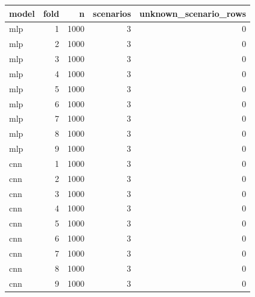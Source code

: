 \begin{tabular}{lrrrr}
\toprule
model & fold & n & scenarios & unknown\_scenario\_rows \\
\midrule
mlp & 1 & 1000 & 3 & 0 \\
mlp & 2 & 1000 & 3 & 0 \\
mlp & 3 & 1000 & 3 & 0 \\
mlp & 4 & 1000 & 3 & 0 \\
mlp & 5 & 1000 & 3 & 0 \\
mlp & 6 & 1000 & 3 & 0 \\
mlp & 7 & 1000 & 3 & 0 \\
mlp & 8 & 1000 & 3 & 0 \\
mlp & 9 & 1000 & 3 & 0 \\
cnn & 1 & 1000 & 3 & 0 \\
cnn & 2 & 1000 & 3 & 0 \\
cnn & 3 & 1000 & 3 & 0 \\
cnn & 4 & 1000 & 3 & 0 \\
cnn & 5 & 1000 & 3 & 0 \\
cnn & 6 & 1000 & 3 & 0 \\
cnn & 7 & 1000 & 3 & 0 \\
cnn & 8 & 1000 & 3 & 0 \\
cnn & 9 & 1000 & 3 & 0 \\
\bottomrule
\end{tabular}
